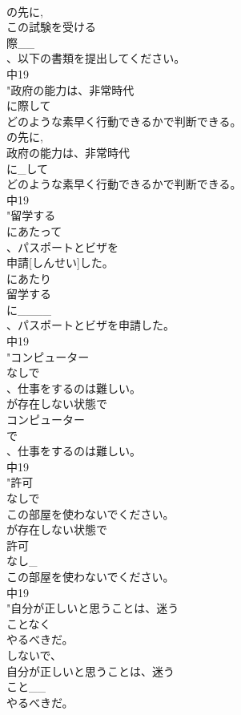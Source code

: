 \documentclass[8pt]{extreport}
\begin{document}
\begin{CJK}{UTF8}{min}
\\	の先に, 
\\	この試験を受ける
\\	際__
\\	、以下の書類を提出してください。
\\	中19
\\	"政府の能力は、非常時代
\\	に際して
\\	どのような素早く行動できるかで判断できる。
\\	の先に, 
\\	政府の能力は、非常時代
\\	に_して
\\	どのような素早く行動できるかで判断できる。
\\	中19
\\	"留学する
\\	にあたって
\\	、パスポートとビザを
\\	申請[しんせい]した。
\\	にあたり
\\	留学する
\\	に____
\\	、パスポートとビザを申請した。
\\	中19
\\	"コンピューター
\\	なしで
\\	、仕事をするのは難しい。
\\	が存在しない状態で	
\\	コンピューター
\\	で
\\	、仕事をするのは難しい。
\\	中19
\\	"許可
\\	なしで
\\	この部屋を使わないでください。
\\	が存在しない状態で
\\	許可
\\	なし_
\\	この部屋を使わないでください。
\\	中19
\\	"自分が正しいと思うことは、迷う
\\	ことなく
\\	やるべきだ。
\\	しないで、 
\\	自分が正しいと思うことは、迷う
\\	こと__
\\	やるべきだ。

\end{CJK}
\end{document}
